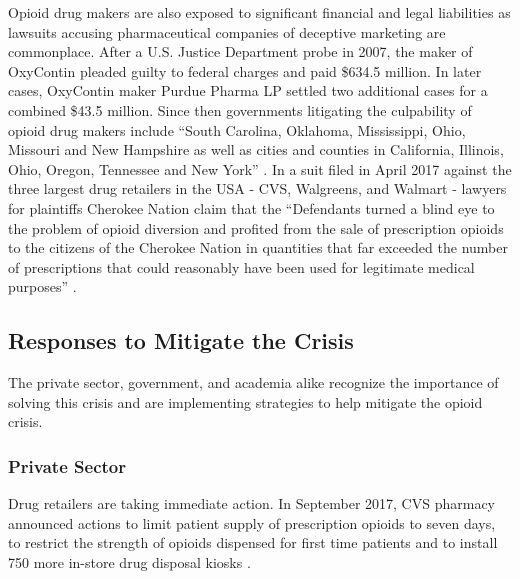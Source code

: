 \documentclass[sigconf]{acmart}
\begin{document}
Opioid drug makers are also exposed to significant financial and legal liabilities as lawsuits accusing pharmaceutical companies of deceptive marketing are commonplace. After a U.S. Justice Department probe in 2007, the maker of OxyContin pleaded guilty to federal charges and paid \$634.5 million. In later cases, OxyContin maker Purdue Pharma LP settled two additional cases for a combined \$43.5 million. Since then governments litigating the culpability of opioid drug makers include ``South Carolina, Oklahoma, Mississippi, Ohio, Missouri and New Hampshire as well as cities and counties in California, Illinois, Ohio, Oregon, Tennessee and New York'' \cite{opsis11}. In a suit filed in April 2017 against the three largest drug retailers in the USA - CVS, Walgreens, and Walmart - lawyers for plaintiffs Cherokee Nation claim that the ``Defendants turned a blind eye to the problem of opioid diversion and profited from the sale of prescription opioids to the citizens of the Cherokee Nation in quantities that far exceeded the number of prescriptions that could reasonably have been used for legitimate medical purposes'' \cite{opsis5}.

\subsection{Responses to Mitigate the Crisis}
The private sector, government, and academia alike recognize the importance of solving this crisis and are implementing strategies to help mitigate the opioid crisis. 

\subsubsection{Private Sector}
Drug retailers are taking immediate action. In September 2017, CVS pharmacy announced actions to limit patient supply of prescription opioids to seven days, to restrict the strength of opioids dispensed for first time patients and to install 750 more in-store drug disposal kiosks \cite{Charles01} \cite{Hansen01}.
\end{document}
